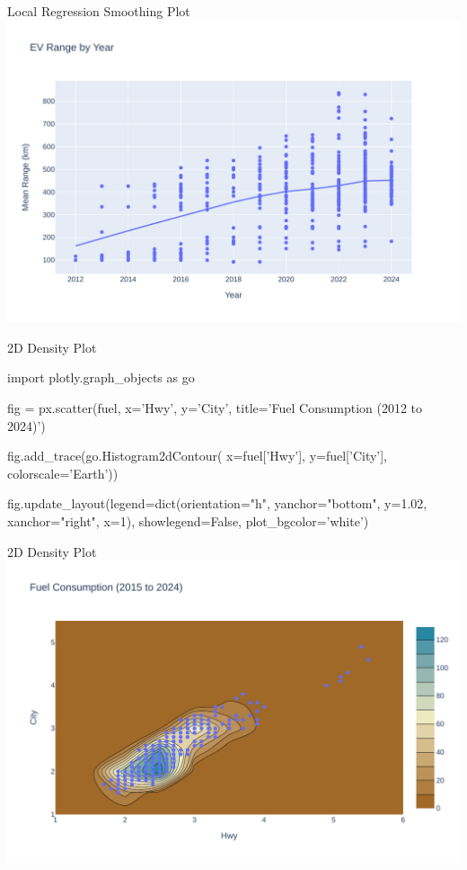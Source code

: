 \documentclass[ignorenonframetext,xcolor=x11names]{beamer}
\begin{document}
\begin{frame}{Local Regression Smoothing Plot}
  \includegraphics[width=\textwidth]{px.fuel.linesSmooth.pdf}
\end{frame}



\begin{frame}[fragile]{2D Density Plot}
\footnotesize
\begin{pythoncode}
import plotly.graph_objects as go

fig = px.scatter(fuel, 
    x='Hwy', y='City',
    title='Fuel Consumption (2012 to 2024)')

fig.add_trace(go.Histogram2dContour(
    x=fuel['Hwy'], y=fuel['City'], 
    colorscale='Earth'))

fig.update_layout(legend=dict(orientation="h", yanchor="bottom", 
                  y=1.02, xanchor="right", x=1),
                  showlegend=False, plot_bgcolor='white')
\end{pythoncode}
\end{frame}

\begin{frame}{2D Density Plot}
  \includegraphics[width=\textwidth]{px.fuel.density2d.pdf}
\end{frame}
\end{document}
